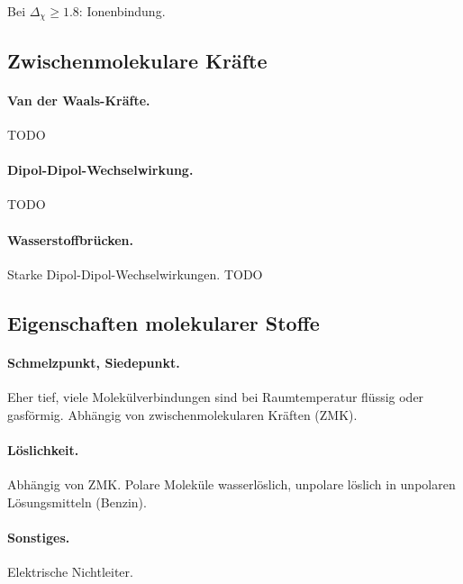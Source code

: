 Bei $\Delta_\chi \geqslant 1.8$: Ionenbindung.

\subsection{Zwischenmolekulare Kräfte}

\paragraph{Van der Waals-Kräfte.}

TODO

\paragraph{Dipol-Dipol-Wechselwirkung.}

TODO

\paragraph{Wasserstoffbrücken.} Starke Dipol-Dipol-Wechselwirkungen. TODO

\subsection{Eigenschaften molekularer Stoffe}

\paragraph{Schmelzpunkt, Siedepunkt.}

Eher tief, viele Molekülverbindungen sind bei Raumtemperatur flüssig oder gasförmig. Abhängig von zwischenmolekularen Kräften (ZMK).

\paragraph{Löslichkeit.}

Abhängig von ZMK. Polare Moleküle wasserlöslich, unpolare löslich in unpolaren Lösungsmitteln (Benzin).

\paragraph{Sonstiges.}

Elektrische Nichtleiter.


